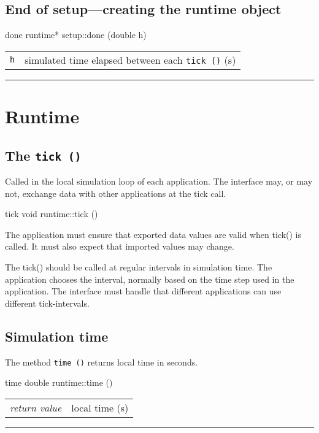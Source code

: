 \documentclass[a4paper]{report}
\makeatletter
\newenvironment{parameters}%
{\begin{tabular}{@{\hspace{2em}}lp{0.6\textwidth}}}%
{\end{tabular}\par\vspace{1mm}\par\hrule\par\vspace{5mm}}
\makeatother
\begin{document}
\subsection{End of setup---creating the runtime object}

\begin{head}{done}
  runtime* setup::done (double h)
\end{head}
\begin{parameters}
  \lstinline|h| & simulated time elapsed between each \lstinline|tick ()| (s) \\
\end{parameters}

\section{Runtime}

\subsection{The \lstinline|tick ()|}

Called in the local simulation loop of each application.  The
interface may, or may not, exchange data with other applications at
the tick call.

\begin{head}{tick}
  void runtime::tick ()
\end{head}

The application must ensure that exported data values are valid when
tick() is called.  It must also expect that imported values may change.

The tick() should be called at regular intervals in simulation time.
The application chooses the interval, normally based on the time step
used in the application.  The interface must handle that different
applications can use different tick-intervals.

\subsection{Simulation time}

The method \lstinline|time ()| returns local time in seconds.

\begin{head}{time}
  double runtime::time ()
\end{head}
\begin{parameters}
  \emph{return value} & local time (s) \\
\end{parameters}
\end{document}

